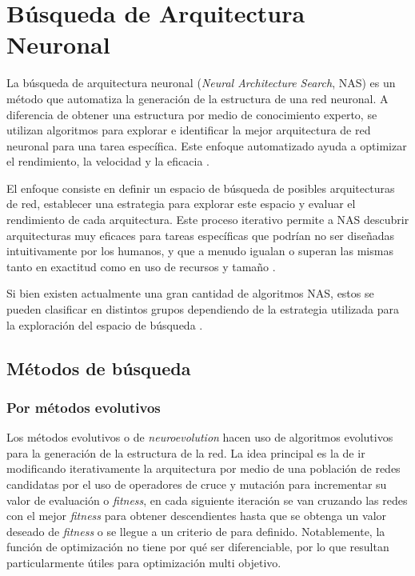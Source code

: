 \section{Búsqueda de Arquitectura Neuronal}
La búsqueda de arquitectura neuronal (\textit{Neural Architecture Search}, NAS) \cite{zoph_neural_2017} es un método que automatiza la generación de la estructura de una red neuronal. A diferencia de obtener una estructura por medio de conocimiento experto, se utilizan algoritmos para explorar e identificar la mejor arquitectura de red neuronal para una tarea específica. Este enfoque automatizado ayuda a optimizar el rendimiento, la velocidad y la eficacia \cite{ultralytics_busqueda_nas}.

El enfoque consiste en definir un espacio de búsqueda de posibles arquitecturas de red, establecer una estrategia para explorar este espacio y evaluar el rendimiento de cada arquitectura. Este proceso iterativo permite a NAS descubrir arquitecturas muy eficaces para tareas específicas que podrían no ser diseñadas intuitivamente por los humanos, y que a menudo igualan o superan las mismas tanto en exactitud como en uso de recursos y tamaño \cite{poyser_neural_2024}.

Si bien existen actualmente una gran cantidad de algoritmos NAS, estos se pueden clasificar en distintos grupos dependiendo de la estrategia utilizada para la exploración del espacio de búsqueda \cite{baymurzina_review_2022, white_neural_2023}.

\subsection{Métodos de búsqueda}
\subsubsection{Por métodos evolutivos}
Los métodos evolutivos o de \textit{neuroevolution} hacen uso de algoritmos evolutivos para la generación de la estructura de la red. La idea principal es la de ir modificando iterativamente la arquitectura por medio de una población de redes candidatas por el uso de operadores de cruce y mutación para incrementar su valor de evaluación o \textit{fitness}, en cada siguiente iteración se van cruzando las redes con el mejor \textit{fitness} para obtener descendientes hasta que se obtenga un valor deseado de \textit{fitness} o se llegue a un criterio de para definido. Notablemente, la función de optimización no tiene por qué ser diferenciable, por lo que resultan particularmente útiles para optimización multi objetivo. 

